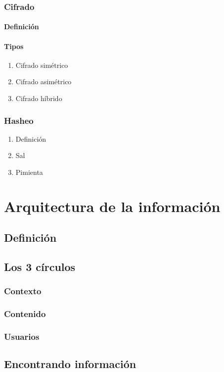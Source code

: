 \documentclass[12pt]{report}
\begin{document}
			\subsubsection{Cifrado}
				\paragraph{Definición}
				\paragraph{Tipos}
					\begin{enumerate}
						\item Cifrado simétrico
						\item Cifrado asimétrico
						\item Cifrado híbrido
					\end{enumerate}
			\subsubsection{Hasheo}
				\begin{enumerate}
					\item Definición
					\item Sal
					\item Pimienta
				\end{enumerate}
	\section{Arquitectura de la información}
		\subsection{Definición}
		\subsection{Los 3 círculos}
			\subsubsection{Contexto}
			\subsubsection{Contenido}
			\subsubsection{Usuarios}
		\subsection{Encontrando información}
\end{document}
